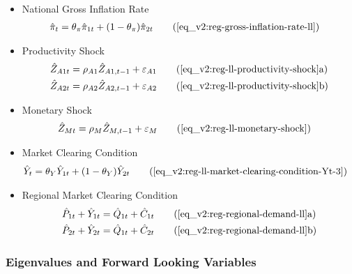 \documentclass[../thesis.tex]{subfiles}
\begin{document}
{\begin{itemize}
	\item National Gross Inflation Rate
	\begin{align}
		\hat{\pi}_{t} &= \theta_{\pi} \hat{\pi}_{1t} + (1 - \theta_{\pi}) \hat{\pi}_{2t} \tag{\ref{eq_v2:reg-gross-inflation-rate-ll}}
	\end{align}
	
	\item Productivity Shock
	\begin{alignat}{2}
		\hat{Z}_{A1 t} &= \rho_{A1} \hat{Z}_{A1, t-1} + \varepsilon_{A1} \tag{\ref{eq_v2:reg-ll-productivity-shock}a} \\
		\hat{Z}_{A2 t} &= \rho_{A2} \hat{Z}_{A2, t-1} + \varepsilon_{A2} \tag{\ref{eq_v2:reg-ll-productivity-shock}b}
	\end{alignat}
	
	\item Monetary Shock
	\begin{alignat}{2}
		\hat{Z}_{Mt} &= \rho_M \hat{Z}_{M,t-1} + \varepsilon_{M} \tag{\ref{eq_v2:reg-ll-monetary-shock}}
	\end{alignat}
	
	\item Market Clearing Condition
	\begin{align}
		\hat{Y}_{t} &= \theta_{Y} \hat{Y}_{1t} + (1-\theta_{Y}) \hat{Y}_{2t} \tag{\ref{eq_v2:reg-ll-market-clearing-condition-Yt-3}}
	\end{align}
	
	\item Regional Market Clearing Condition
	\begin{align}
		\hat{P}_{1 t} + \hat{Y}_{1 t} &= \hat{Q}_{1t} + \hat{C}_{1 t} \tag{\ref{eq_v2:reg-regional-demand-ll}a} \\
		\hat{P}_{2 t} + \hat{Y}_{2 t} &= \hat{Q}_{1t} + \hat{C}_{2 t} \tag{\ref{eq_v2:reg-regional-demand-ll}b}
	\end{align}
		
	\end{itemize}
	
} %

\subsubsection{Eigenvalues and Forward Looking Variables}
\end{document}
